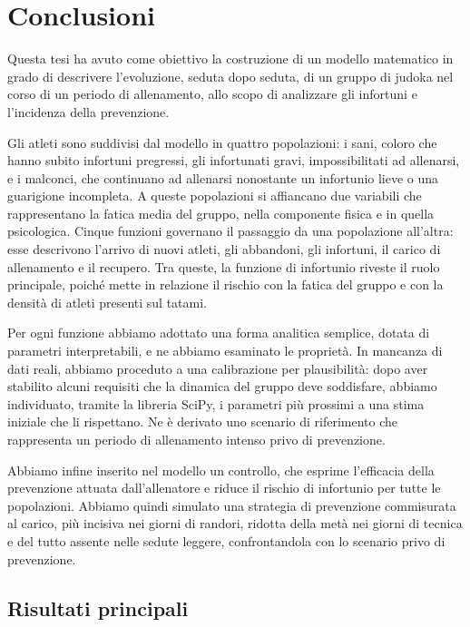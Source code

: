 \chapter{Conclusioni}

Questa tesi ha avuto come obiettivo la costruzione di un modello matematico in grado di descrivere l'evoluzione, seduta dopo seduta, di un gruppo di judoka nel corso di un periodo di allenamento, allo scopo di analizzare gli infortuni e l'incidenza della prevenzione. \par

Gli atleti sono suddivisi dal modello in quattro popolazioni: i sani, coloro che hanno subito infortuni pregressi, gli infortunati gravi, impossibilitati ad allenarsi, e i malconci, che continuano ad allenarsi nonostante un infortunio lieve o una guarigione incompleta. A queste popolazioni si affiancano due variabili che rappresentano la fatica media del gruppo, nella componente fisica e in quella psicologica. Cinque funzioni governano il passaggio da una popolazione all'altra: esse descrivono l'arrivo di nuovi atleti, gli abbandoni, gli infortuni, il carico di allenamento e il recupero. Tra queste, la funzione di infortunio riveste il ruolo principale, poiché mette in relazione il rischio con la fatica del gruppo e con la densità di atleti presenti sul tatami. \par

Per ogni funzione abbiamo adottato una forma analitica semplice, dotata di parametri interpretabili, e ne abbiamo esaminato le proprietà. In mancanza di dati reali, abbiamo proceduto a una calibrazione per plausibilità: dopo aver stabilito alcuni requisiti che la dinamica del gruppo deve soddisfare, abbiamo individuato, tramite la libreria SciPy, i parametri più prossimi a una stima iniziale che li rispettano. Ne è derivato uno scenario di riferimento che rappresenta un periodo di allenamento intenso privo di prevenzione. \par

Abbiamo infine inserito nel modello un controllo, che esprime l'efficacia della prevenzione attuata dall'allenatore e riduce il rischio di infortunio per tutte le popolazioni. Abbiamo quindi simulato una strategia di prevenzione commisurata al carico, più incisiva nei giorni di randori, ridotta della metà nei giorni di tecnica e del tutto assente nelle sedute leggere, confrontandola con lo scenario privo di prevenzione.

\section{Risultati principali}

